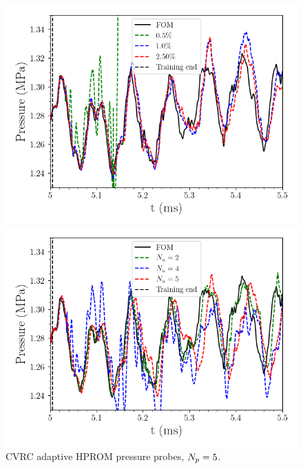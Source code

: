 \begin{figure}
    \begin{minipage}{0.49\linewidth}
        \includegraphics[width=0.99\linewidth]{Chapters/AdaptiveResults/Images/cvrc/pressure_probe_wrt_sampling.png}
    \end{minipage}
    \begin{minipage}{0.49\linewidth}
        \includegraphics[width=0.99\linewidth]{Chapters/AdaptiveResults/Images/cvrc/pressure_probe_wrt_iter.png}
    \end{minipage}
    \caption{CVRC adaptive HPROM pressure probes, $N_p = 5$.}
\end{figure}

